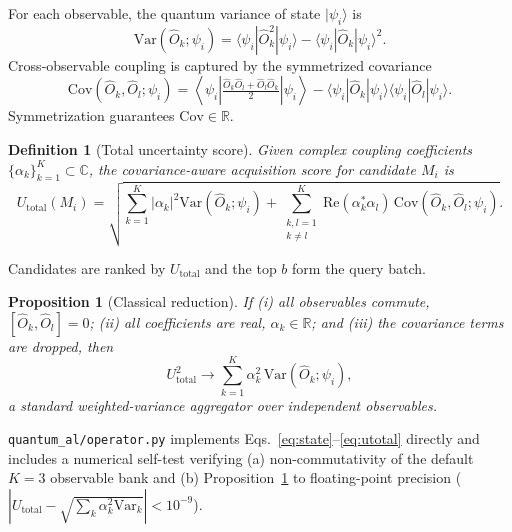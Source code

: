 \documentclass[conference]{IEEEtran}
\newtheorem{definition}{Definition}
\newtheorem{proposition}{Proposition}
\begin{document}
For each observable, the quantum variance of state $|\psi_i\rangle$ is
\begin{equation}
\mathrm{Var}(\hat{O}_k;\psi_i) = \langle\psi_i|\hat{O}_k^2|\psi_i\rangle - \langle\psi_i|\hat{O}_k|\psi_i\rangle^2. \label{eq:variance}
\end{equation}
Cross-observable coupling is captured by the symmetrized covariance
\begin{equation}
\mathrm{Cov}(\hat{O}_k,\hat{O}_l;\psi_i) = \left\langle\psi_i\left|\tfrac{\hat{O}_k\hat{O}_l+\hat{O}_l\hat{O}_k}{2}\right|\psi_i\right\rangle - \langle\psi_i|\hat{O}_k|\psi_i\rangle\langle\psi_i|\hat{O}_l|\psi_i\rangle. \label{eq:covariance}
\end{equation}
Symmetrization guarantees $\mathrm{Cov}\in\mathbb{R}$.

\begin{definition}[Total uncertainty score]\label{def:total}
Given complex coupling coefficients $\{\alpha_k\}_{k=1}^K \subset \mathbb{C}$, the covariance-aware acquisition score for candidate $M_i$ is
\begin{equation}
U_{\mathrm{total}}(M_i) = \sqrt{\sum_{k=1}^K |\alpha_k|^2 \mathrm{Var}(\hat{O}_k;\psi_i) + \sum_{\substack{k,l=1\\k\neq l}}^{K} \mathrm{Re}(\alpha_k^*\alpha_l)\,\mathrm{Cov}(\hat{O}_k,\hat{O}_l;\psi_i)}. \label{eq:utotal}
\end{equation}
\end{definition}

Candidates are ranked by $U_{\mathrm{total}}$ and the top $b$ form the query batch.

\begin{proposition}[Classical reduction]\label{prop:classical}
If (i) all observables commute, $[\hat{O}_k,\hat{O}_l]=0$; (ii) all coefficients are real, $\alpha_k \in \mathbb{R}$; and (iii) the covariance terms are dropped, then
\begin{equation}
U_{\mathrm{total}}^2 \to \sum_{k=1}^K \alpha_k^2\, \mathrm{Var}(\hat{O}_k;\psi_i),
\end{equation}
a standard weighted-variance aggregator over independent observables.
\end{proposition}

\texttt{quantum\_al/operator.py} implements Eqs.~\eqref{eq:state}--\eqref{eq:utotal} directly and includes a numerical self-test verifying (a) non-commutativity of the default $K{=}3$ observable bank and (b) Proposition~\ref{prop:classical} to floating-point precision ($|U_{\mathrm{total}} - \sqrt{\sum_k \alpha_k^2\mathrm{Var}_k}| < 10^{-9}$).
\end{document}
